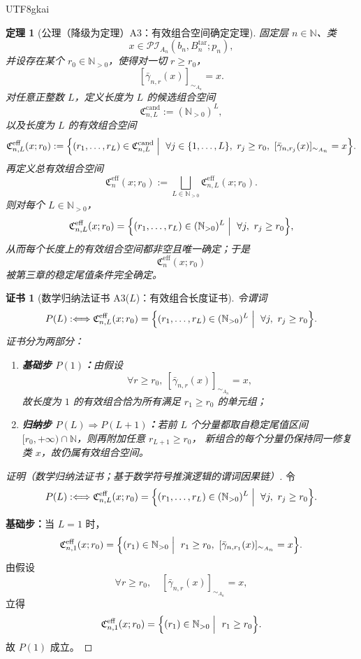 \documentclass[12pt]{article}
\newtheorem{theorem}{定理}[section]
\newtheorem{Certificate}{证书}[section]
\newcommand{\NN}{\mathbb{N}}
\begin{document}
\begin{CJK*}{UTF8}{gkai}
\begin{theorem}[公理（降级为定理）A3：有效组合空间确定定理]
\label{thm:tex36-a3}
固定层 $n\in\NN$、类
\[
  x\in \mathcal{PI}_{A_n}(b_n,B_n^{\mathrm{tar}};p_n),
\]
并设存在某个 $r_0\in\NN_{>0}$，使得对一切 $r\ge r_0$，
\[
  [\bar{\gamma}_{n,r}(x)]_{\sim_{A_n}}=x.
\]
对任意正整数 $L$，定义长度为 $L$ 的候选组合空间
\[
  \mathfrak C_{n,L}^{\mathrm{cand}}
  :=
  (\NN_{>0})^L,
\]
以及长度为 $L$ 的有效组合空间
\[
  \mathfrak C_{n,L}^{\mathrm{eff}}(x;r_0)
  :=
  \Bigl\{
    (r_1,\ldots,r_L)\in \mathfrak C_{n,L}^{\mathrm{cand}}
    \Bigm|\
    \forall j\in\{1,\ldots,L\},\
    r_j\ge r_0,\
    [\bar{\gamma}_{n,r_j}(x)]_{\sim_{A_n}}=x
  \Bigr\}.
\]
再定义总有效组合空间
\[
  \mathfrak C_{n}^{\mathrm{eff}}(x;r_0)
  :=
  \bigsqcup_{L\in\NN_{>0}}
  \mathfrak C_{n,L}^{\mathrm{eff}}(x;r_0).
\]
则对每个 $L\in\NN_{>0}$，
\[
  \mathfrak C_{n,L}^{\mathrm{eff}}(x;r_0)
  =
  \Bigl\{
    (r_1,\ldots,r_L)\in (\NN_{>0})^L
    \Bigm|\
    \forall j,\ r_j\ge r_0
  \Bigr\},
\]
从而每个长度上的有效组合空间都非空且唯一确定；于是
\[
  \mathfrak C_{n}^{\mathrm{eff}}(x;r_0)
\]
被第三章的稳定尾值条件完全确定。
\end{theorem}

\begin{Certificate}[数学归纳法证书 A3($L$)：有效组合长度证书]
\label{cert:tex36-a3}
令谓词
\[
  P(L)
  :
  \Longleftrightarrow
  \mathfrak C_{n,L}^{\mathrm{eff}}(x;r_0)
  =
  \Bigl\{
    (r_1,\ldots,r_L)\in (\NN_{>0})^L
    \Bigm|\
    \forall j,\ r_j\ge r_0
  \Bigr\}.
\]
证书分为两部分：
\begin{enumerate}
  \item \textbf{基础步 $P(1)$：}由假设
  \[
    \forall r\ge r_0,\ [\bar{\gamma}_{n,r}(x)]_{\sim_{A_n}}=x,
  \]
  故长度为 $1$ 的有效组合恰为所有满足 $r_1\ge r_0$ 的单元组；
  \item \textbf{归纳步 $P(L)\Rightarrow P(L+1)$：}若前 $L$ 个分量都取自稳定尾值区间 $[r_0,+\infty)\cap\NN$，则再附加任意 $r_{L+1}\ge r_0$，
  新组合的每个分量仍保持同一修复类 $x$，故仍属有效组合空间。
\end{enumerate}
\end{Certificate}

\begin{proof}[证明（数学归纳法证书；基于数学符号推演逻辑的谓词因果链）]
令
\[
  P(L)
  :
  \Longleftrightarrow
  \mathfrak C_{n,L}^{\mathrm{eff}}(x;r_0)
  =
  \Bigl\{
    (r_1,\ldots,r_L)\in (\NN_{>0})^L
    \Bigm|\
    \forall j,\ r_j\ge r_0
  \Bigr\}.
\]

\textbf{基础步：}当 $L=1$ 时，
\[
  \mathfrak C_{n,1}^{\mathrm{eff}}(x;r_0)
  =
  \Bigl\{
    (r_1)\in \NN_{>0}
    \Bigm|\
    r_1\ge r_0,\
    [\bar{\gamma}_{n,r_1}(x)]_{\sim_{A_n}}=x
  \Bigr\}.
\]
由假设
\[
  \forall r\ge r_0,\quad
  [\bar{\gamma}_{n,r}(x)]_{\sim_{A_n}}=x,
\]
立得
\[
  \mathfrak C_{n,1}^{\mathrm{eff}}(x;r_0)
  =
  \Bigl\{
    (r_1)\in \NN_{>0}
    \Bigm|\
    r_1\ge r_0
  \Bigr\}.
\]
故 $P(1)$ 成立。


\end{proof}
\end{CJK*}
\end{document}
